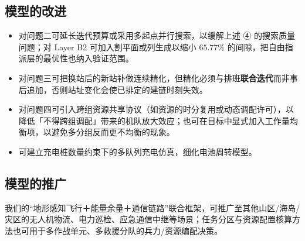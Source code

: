 \subsection{模型的改进}

\begin{itemize}
	\item 对问题二可延长迭代预算或采用多起点并行搜索，以缓解上述 ④ 的搜索质量问题；对 Layer B2 可加入割平面或列生成以缩小 $65.77\%$ 的间隙，把自由指派层的最优性也纳入验证范围。
	\item 对问题三可把换站后的新站补做连续精化，但精化必须与排班\textbf{联合迭代}而非事后追加，否则站址变化会使已排定的建链时刻失效。
	\item 对问题四可引入跨组资源共享协议（如资源的时分复用或动态调配许可），以降低「不得跨组调配」带来的机队放大效应；也可在目标中显式加入工作量均衡项，以避免多分组反而更不均衡的现象。
	\item 可建立充电桩数量约束下的多队列充电仿真，细化电池周转模型。
\end{itemize}

\subsection{模型的推广}

我们的“地形感知飞行＋能量余量＋通信链路”联合框架，可推广至其他山区/海岛/灾区的无人机物流、电力巡检、应急通信中继等场景；任务分区与资源配置核算方法也可用于多作战单元、多救援分队的兵力/资源编配决策。
